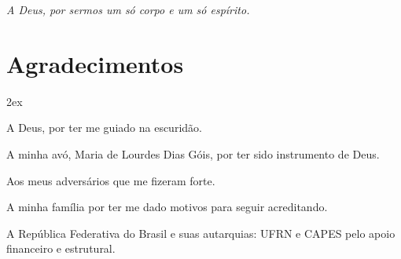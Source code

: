 
\begin{titlepage}

\vspace*{\fill}

\hfill
\begin{minipage}{0.5\linewidth}
\begin{flushright}
\large\it
A Deus, por sermos um só corpo e um só espírito.
\end{flushright}
\end{minipage}

\vspace*{\fill}

\end{titlepage}

%
%


\chapter*{Agradecimentos}
\thispagestyle{empty}

\begin{trivlist}  \itemsep 2ex

\item A Deus, por ter me guiado na escuridão.

\item A minha avó, Maria de Lourdes Dias Góis, por ter sido instrumento de Deus.

\item Aos meus adversários que me fizeram forte.

\item A minha família por ter me dado motivos para seguir acreditando.

\item A República Federativa do Brasil e suas autarquias: UFRN e CAPES pelo apoio financeiro e estrutural.

\end{trivlist}
